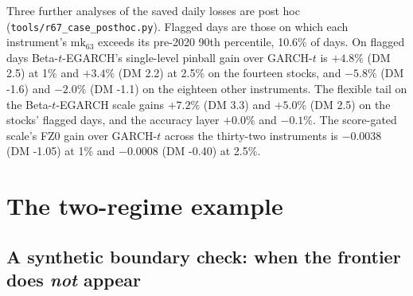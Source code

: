 \documentclass[11pt]{article}
\begin{document}
Three further analyses of the saved daily losses are post hoc (\texttt{tools/r67\_case\_posthoc.py}). Flagged days are those on which each instrument's $\mathrm{mk}_{63}$ exceeds its pre-2020 90th percentile, 10.6\% of days. On flagged days Beta-$t$-EGARCH's single-level pinball gain over GARCH-$t$ is $+4.8\%$ (DM 2.5) at 1\% and $+3.4\%$ (DM 2.2) at 2.5\% on the fourteen stocks, and $-5.8\%$ (DM -1.6) and $-2.0\%$ (DM -1.1) on the eighteen other instruments. The flexible tail on the Beta-$t$-EGARCH scale gains $+7.2\%$ (DM 3.3) and $+5.0\%$ (DM 2.5) on the stocks' flagged days, and the accuracy layer $+0.0\%$ and $-0.1\%$. The score-gated scale's FZ0 gain over GARCH-$t$ across the thirty-two instruments is $-0.0038$ (DM -1.05) at 1\% and $-0.0008$ (DM -0.40) at 2.5\%.


\section{The two-regime example}
\subsection*{A synthetic boundary check: when the frontier does
\emph{not} appear}\label{sec:toy}
\end{document}
